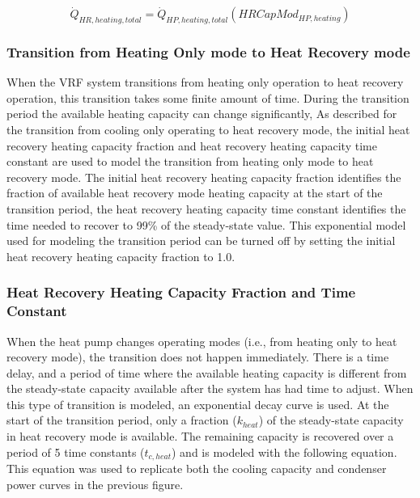 \begin{equation}
  \dot{Q}_{HR,heating,total} = \dot{Q}_{HP,heating,total} \left( HRCapMod_{HP,heating} \right)
\end{equation}

\subsubsection{Transition from Heating Only mode to Heat Recovery mode}\label{transition-from-heating-only-mode-to-heat-recovery-mode}

When the VRF system transitions from heating only operation to heat recovery operation, this transition takes some finite amount of time. During the transition period the available heating capacity can change significantly, As described for the transition from cooling only operating to heat recovery mode, the initial heat recovery heating capacity fraction and heat recovery heating capacity time constant are used to model the transition from heating only mode to heat recovery mode. The initial heat recovery heating capacity fraction identifies the fraction of available heat recovery mode heating capacity at the start of the transition period, the heat recovery heating capacity time constant identifies the time needed to recover to 99\% of the steady-state value. This exponential model used for modeling the transition period can be turned off by setting the initial heat recovery heating capacity fraction to 1.0.

\subsubsection{Heat Recovery Heating Capacity Fraction and Time Constant}\label{heat-recovery-heating-capacity-fraction-and-time-constant}

When the heat pump changes operating modes (i.e., from heating only to heat recovery mode), the transition does not happen immediately. There is a time delay, and a period of time where the available heating capacity is different from the steady-state capacity available after the system has had time to adjust. When this type of transition is modeled, an exponential decay curve is used. At the start of the transition period, only a fraction (\(k_{heat}\)) of the steady-state capacity in heat recovery mode is available. The remaining capacity is recovered over a period of 5 time constants (\(t_{c,heat}\)) and is modeled with the following equation. This equation was used to replicate both the cooling capacity and condenser power curves in the previous figure.

